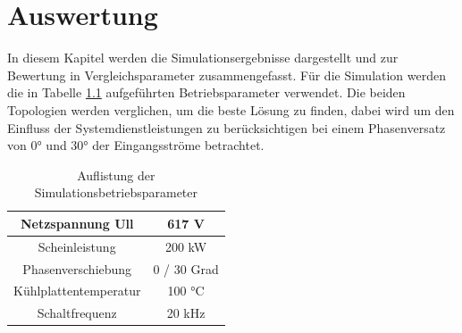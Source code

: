 \chapter{Auswertung}
In diesem Kapitel werden die Simulationsergebnisse dargestellt und zur Bewertung in Vergleichsparameter zusammengefasst. Für die Simulation werden die in Tabelle \ref{tab:Betriebspara} aufgeführten Betriebsparameter verwendet. Die beiden Topologien werden verglichen, um die beste Lösung zu finden, dabei wird um den Einfluss der Systemdienstleistungen zu berücksichtigen bei einem Phasenversatz von 0° und 30° der Eingangsströme betrachtet.

\begin{table}
	\centering
\begin{tabular}{|c|c|}
	\hline
	Netzspannung \gls{Ull} & 617 \si{\volt} \\
	\hline
	Scheinleistung & 200 kW \\
	\hline
	Phasenverschiebung & 0 / 30 Grad \\
	\hline
	Kühlplattentemperatur & 100 °C \\ %
	\hline
	Schaltfrequenz & 20 kHz \\
	\hline
\end{tabular}
\caption{Auflistung der Simulationsbetriebsparameter}
\label{tab:Betriebspara}
\end{table}




